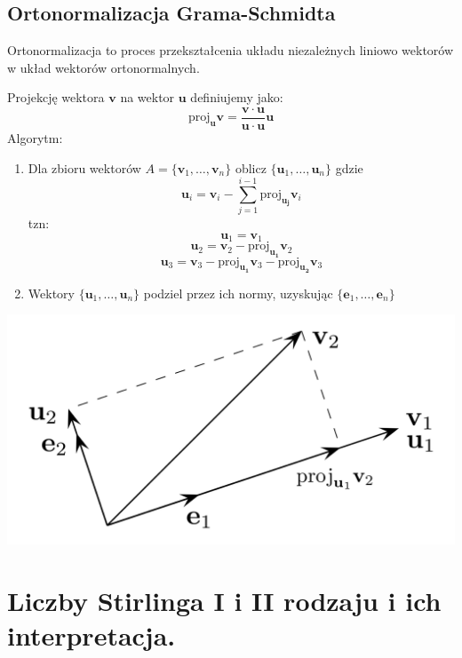 \documentclass[12pt]{article}
\begin{document}
    \newpage
    \subsection{Ortonormalizacja Grama-Schmidta}

    Ortonormalizacja to proces przekształcenia układu niezależnych liniowo wektorów w układ wektorów ortonormalnych.

    Projekcję wektora $\mathbf{v}$ na wektor $\mathbf{u}$ definiujemy jako:
    \[\mathrm{proj}_\mathbf{u} \mathbf{v} = \frac{\mathbf{v} \cdot \mathbf{u}}{\mathbf{u} \cdot \mathbf{u}} \mathbf{u}\]
    Algorytm:

    \begin{enumerate}

        \item Dla zbioru wektorów $A = \{\mathbf{v}_1, \dots,  \mathbf{v}_n\}$ oblicz $\{{\mathbf{u}_1, \ldots, \mathbf{u}_n}\}$ gdzie \[\mathbf{u}_i = \mathbf{v}_i - \sum_{j=1}^{i-1} \mathrm{proj}_\mathbf{u_j} \mathbf{v}_i\]
        tzn:
        \[\mathbf{u}_1 = \mathbf{v}_1\]
        \[\mathbf{u}_2 = \mathbf{v}_2 - \mathrm{proj}_\mathbf{u_1} \mathbf{v}_2\]
        \[\mathbf{u}_3 = \mathbf{v}_3 - \mathrm{proj}_\mathbf{u_1} \mathbf{v}_3 - \mathrm{proj}_\mathbf{u_2} \mathbf{v}_3\]

        \item Wektory $\{{\mathbf{u}_1, \ldots, \mathbf{u}_n}\}$ podziel przez ich normy, uzyskując $\{{\mathbf{e}_1, \ldots, \mathbf{e}_n}\}$

    \end{enumerate}

    \includegraphics[scale=0.20]{graphics/15_6.png}

    \newpage

    \section{Liczby Stirlinga I i II rodzaju i ich interpretacja.}
\end{document}

